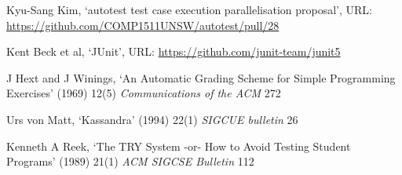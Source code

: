 \documentclass[hidelinks]{report}
\begin{document}
\begin{thebibliography}{99}
Kyu-Sang Kim, ‘autotest test case execution parallelisation proposal’, URL: \url{https://github.com/COMP1511UNSW/autotest/pull/28}

Kent Beck et al, ‘JUnit’, URL: \url{https://github.com/junit-team/junit5}

J Hext and J Winings, ‘An Automatic Grading Scheme for Simple Programming Exercises’ (1969) 12(5) \textit{Communications of the ACM} 272

Urs von Matt, ‘Kassandra’ (1994) 22(1) \textit{SIGCUE bulletin} 26

Kenneth A Reek, ‘The TRY System -or- How to Avoid Testing Student Programs’ (1989) 21(1) \textit{ACM SIGCSE Bulletin} 112

\end{thebibliography}
\end{document}
